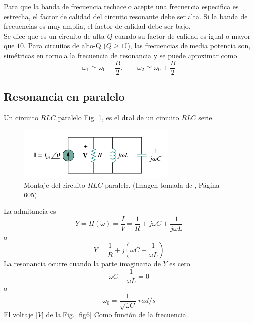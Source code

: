 \documentclass[twocolumn]{IEEEtran}
\begin{document}
\noindent
Para que la banda de frecuencia rechace o acepte una frecuencia especifica es estrecha, el factor de calidad del circuito resonante debe ser alta. Si la banda de frecuencias es muy amplia, el factor de calidad debe ser bajo.\\
Se dice que es un circuito de alta $Q$ cuando su factor de calidad es igual o mayor que $10$. Para circuitos de alto-Q ($Q \geq 10$), las frecuencias de media potencia son, simétricas en torno a la frecuencia de resonancia y se puede aproximar como
\begin{equation}
 \omega _1 \simeq \omega _0 - \frac{B}{2}, \ \ \ \ \ \ \ \ \ \omega _2 \simeq \omega _0 + \frac{B}{2}
\label{ecu25}
\end{equation}

\subsection{Resonancia en paralelo}
\noindent
Un circuito  $RLC$ paralelo Fig. \ref{fig5}, es el dual de un circuito $RLC$ serie.
\begin{figure}[H]
	\centering
		\includegraphics[scale=0.75]{rlcparalelo.png}
	\caption{Montaje del circuito $RLC$ paralelo. (Imagen tomada de \cite{sadiku}, Página 605)}
	\label{fig5}
\end{figure}
\noindent La admitancia es
\begin{equation}
 Y = H(\omega) = \frac{I}{V} = \frac{1}{R} + j \omega C + \frac{1}{j \omega L}
\label{ecu26}
\end{equation}
\noindent o
\begin{equation}
Y = \frac{1}{R} + j\left( {\omega C - \frac{1}{{\omega L}}} \right)
\label{ecu27}
\end{equation}
\noindent
La resonancia ocurre cuando la parte imaginaria de $Y$ es cero
\begin{equation}
 \omega C - \frac{1}{\omega L} = 0
\label{ecu28}
\end{equation}
\noindent o
\begin{equation}
 \omega _0 = \frac{1}{\sqrt{LC}}\ rad/s
\label{ecu29}
\end{equation}
\noindent
El voltaje $\left| V \right|$ de la Fig. \ref{fig6} Como función de la frecuencia.
\end{document}

